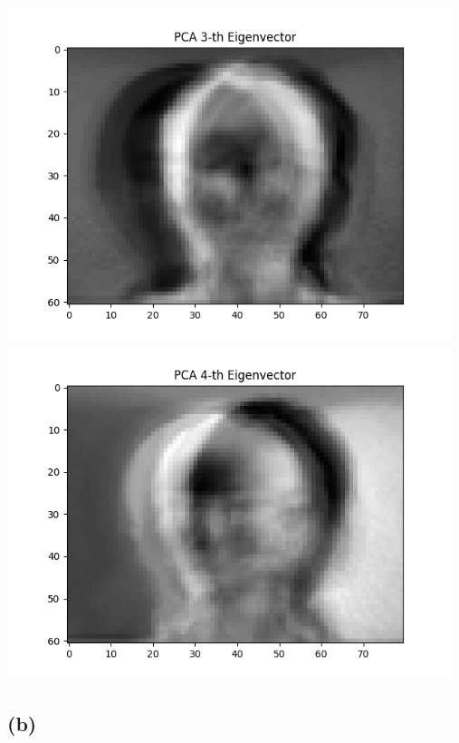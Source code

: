 \includegraphics[width=13cm]{PCA_Eigen3.png}\\
\includegraphics[width=13cm]{PCA_Eigen4.png}

\subsection{(b)}

